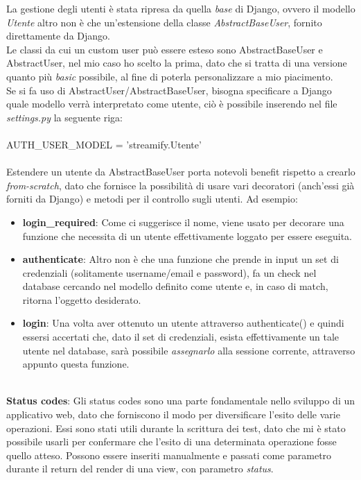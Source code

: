 \documentclass[12pt]{article}
\begin{document}
	\noindent La gestione degli utenti è stata ripresa da quella \textit{base} di Django, ovvero il modello \textit{Utente} altro non è che un'estensione della classe \textit{AbstractBaseUser}, fornito direttamente da Django. \\
	Le classi da cui un custom user può essere esteso sono AbstractBaseUser e AbstractUser, nel mio caso ho scelto la prima, dato che si tratta di una versione quanto più \textit{basic} possibile, al fine di poterla personalizzare a mio piacimento. \\
	Se si fa uso di AbstractUser/AbstractBaseUser, bisogna specificare a Django quale modello verrà interpretato come utente, ciò è possibile inserendo nel file \textit{settings.py} la seguente riga: \\ \\
	AUTH\_USER\_MODEL = 'streamify.Utente' \\ \\
	Estendere un utente da AbstractBaseUser porta notevoli benefit rispetto a crearlo \textit{from-scratch}, dato che fornisce la possibilità di usare vari decoratori (anch'essi già forniti da Django) e metodi per il controllo sugli utenti. Ad esempio: 
	
	\begin{itemize}
		\item \textbf{login\_required}: Come ci suggerisce il nome, viene usato per decorare una funzione che necessita di un utente effettivamente loggato per essere eseguita.
		
		\item \textbf{authenticate}: Altro non è che una funzione che prende in input un set di credenziali (solitamente username/email e password), fa un check nel database cercando nel modello definito come utente e, in caso di match, ritorna l'oggetto desiderato.
		
		\item \textbf{login}: Una volta aver ottenuto un utente attraverso authenticate() e quindi essersi accertati che, dato il set di credenziali, esista effettivamente un tale utente nel database, sarà possibile \textit{assegnarlo} alla sessione corrente, attraverso appunto questa funzione. \\ \\
	\end{itemize}
	
	\noindent \textbf{Status codes}: Gli status codes sono una parte fondamentale nello sviluppo di un applicativo web, dato che forniscono il modo per diversificare l'esito delle varie operazioni. Essi sono stati utili durante la scrittura dei test, dato che mi è stato possibile usarli per confermare che l'esito di una determinata operazione fosse quello atteso. Possono essere inseriti manualmente e passati come parametro durante il return del render di una view, con parametro \textit{status}. \\ \\
	
\end{document}
